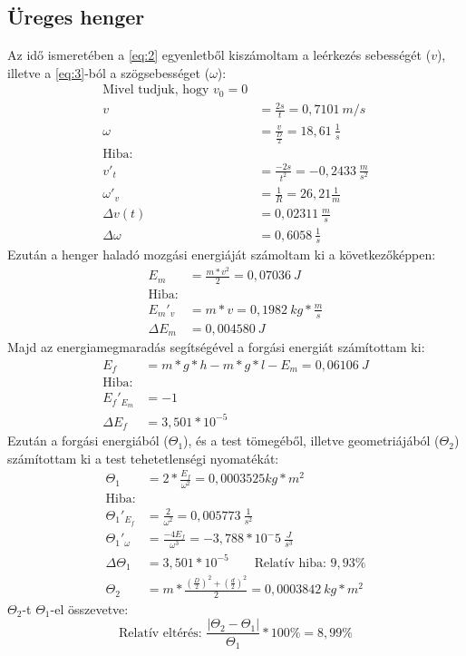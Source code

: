 \documentclass[twoside]{article}
\begin{document}
	\subsection{Üreges henger}\label{subs:3.1}
		Az idő ismeretében a \eqref{eq:2} egyenletből kiszámoltam a leérkezés sebességét ($v$), illetve a \eqref{eq:3}-ból a szögsebességet ($\omega$):
		\begin{align}
			\nonumber\text{Mivel tudjuk, hogy $v_0=0$}\\
			v&=\frac{2s}{t}=0,7101\ m/s\label{eq:22}\\
			\omega&=\frac{v}{\frac{D}{2}}=18,61\ \frac{1}{s}\label{eq:23}\\
			\nonumber\text{Hiba:}\\
			v'_t&=\frac{-2s}{t^2}=-0,2433\ \frac{m}{s^2}\tag{22.1}\label{eq:22.1}\\
			\omega'_v&=\frac{1}{R}=26,21 \frac{1}{m}\tag{23.1}\label{eq:23.1}\\
			\Delta v(t)&=0,02311\ \frac{m}{s}\tag{22.2}\label{eq:22.2}\\
			\Delta \omega&=0,6058\ \frac{1}{s}\tag{23.2}\label{eq:23.2}
		\end{align}
		Ezután a henger haladó mozgási energiáját számoltam ki a következőképpen:
		\begin{align}
		E_m&=\frac{m*v^2}{2}=0,07036\ J\label{eq:24}\\
		\nonumber\text{Hiba:}\\
		{E_m}'_v&=m*v=0,1982\ kg*\frac{m}{s}\tag{24.1}\label{eq:24.1}\\
		\Delta E_m&=0,004580\ J\tag{24.2}\label{eq:24.2}
		\end{align} 
		Majd az energiamegmaradás segítségével a forgási energiát számítottam ki:
		\begin{align}
			E_f&=m*g*h-m*g*l-E_m=0,06106\ J\label{eq:25}\\
			\nonumber\text{Hiba:}\\
			{E_f}'_{E_m}&=-1\tag{26.1}\label{eq:25.1}\\
			\Delta E_f&=3,501*10^{-5}\tag{25.2}\label{eq:25.2}
		\end{align}
		Ezután a forgási energiából ($\Theta_1$), és a test tömegéből, illetve geometriájából ($\Theta_2$) számítottam ki a test tehetetlenségi nyomatékát:
		\begin{align}
			\Theta_1&=2*\frac{E_f}{\omega^2}=0,0003525 kg*m^2\label{eq:26}\\
			\nonumber\text{Hiba:}\\
			{\Theta_1}'_{E_f}&=\frac{2}{\omega^2}=0,005773\ \frac{1}{s^2}\tag{26.1}\label{eq:26.1}\\
			{\Theta_1}'_\omega&=\frac{-4E_f}{\omega^3}=-3,788*10^-5\ \frac{J}{s^3}\tag{26.2} \label{eq:26.2}\\
			\Delta \Theta_1&=3,501*10^{-5}\qquad\text{Relatív hiba: }9,93\%\tag{26.3}
			\label{eq:26.3}\\
			\Theta_2&=m*\frac{\left(\frac{D}{2}\right)^2+\left(\frac{d}{2}\right)^2}{2}=0,0003842\ kg*m^2\label{eq:27}
		\end{align}
		$\Theta_2$-t $\Theta_1$-el összevetve:
		\begin{equation}
			\text{Relatív eltérés: }\frac{|\Theta_2-\Theta_1|}{\Theta_1}*100\%=8,99\%
			\label{eq:28}
		\end{equation}
\end{document}
